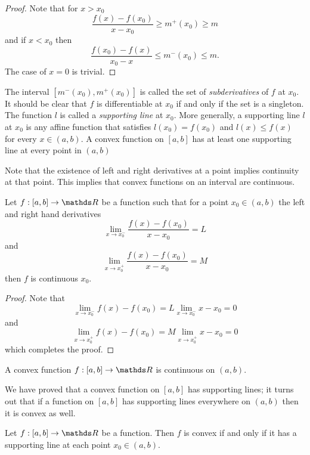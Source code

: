 \begin{proof}
Note that for $x>x_{0}$
\[
\frac{f\left(x\right)-f\left(x_{0}\right)}{x-x_{0}}\geq m^{+}\left(x_{0}\right)\geq m
\]
and if $x<x_{0}$ then 
\[
\frac{f\left(x_{0}\right)-f\left(x\right)}{x_{0}-x}\leq m^{-}\left(x_{0}\right)\leq m.
\]
 The case of $x=0$ is trivial.
\end{proof}
\begin{rem*}
The interval $\left[m^{-}\left(x_{0}\right),m^{+}\left(x_{0}\right)\right]$
is called the set of \emph{subderivatives }of $f$ at $x_{0}$. It
should be clear that $f$ is differentiable at $x_{0}$ if and only
if the set is a singleton. The function $l$ is called a \emph{supporting
line }at $x_{0}$. More generally, a supporting line $l$ at $x_{0}$
is any affine function that satisfies $l\left(x_{0}\right)=f\left(x_{0}\right)$
and $l\left(x\right)\leq f\left(x\right)$ for every $x\in\left(a,b\right)$.
A convex function on $\left[a,b\right]$ has at least one supporting
line at every point in $\left(a,b\right)$
\end{rem*}
Note that the existence of left and right derivatives at a point implies
continuity at that point. This implies that convex functions on an
interval are continuous.
\begin{prop}
\label{prop:leftRightDerivativeImpliesContinuity}Let $f:\left[a,b\right]\to\R$
be a function such that for a point $x_{0}\in\left(a,b\right)$ the
left and right hand derivatives 
\[
\lim_{x\to x_{0}^{-}}\frac{f\left(x\right)-f\left(x_{0}\right)}{x-x_{0}}=L
\]
and
\[
\lim_{x\to x_{0}^{+}}\frac{f\left(x\right)-f\left(x_{0}\right)}{x-x_{0}}=M
\]
then $f$ is continuous $x_{0}.$
\end{prop}

\begin{proof}
Note that 
\[
\lim_{x\to x_{0}^{-}}f\left(x\right)-f\left(x_{0}\right)=L\lim_{x\to x_{0}^{-}}x-x_{0}=0
\]
and
\[
\lim_{x\to x_{0}^{+}}f\left(x\right)-f\left(x_{0}\right)=M\lim_{x\to x_{0}^{+}}x-x_{0}=0
\]
 which completes the proof.
\end{proof}
\begin{cor}
\label{cor:convexContinuous}A convex function $f:\left[a,b\right]\to\R$
is continuous on $\left(a,b\right).$
\end{cor}

We have proved that a convex function on $\left[a,b\right]$ has supporting
lines; it turns out that if a function on $\left[a,b\right]$ has
supporting lines everywhere on $\left(a,b\right)$ then it is convex
as well.
\begin{prop}
\label{prop:convexSupportingLines}Let $f:\left[a,b\right]\to\R$
be a function. Then $f$ is convex if and only if it has a supporting
line at each point $x_{0}\in\left(a,b\right)$.
\end{prop}

